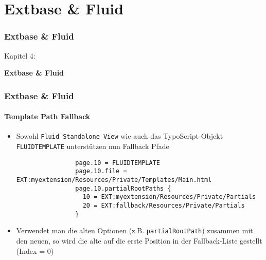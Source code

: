 %

\section{Extbase \& Fluid}
\begin{frame}[fragile]
	\frametitle{Extbase \& Fluid}

	\begin{center}\huge{Kapitel 4:}\end{center}
	\begin{center}\huge{\color{typo3darkgrey}\textbf{Extbase \& Fluid}}\end{center}

\end{frame}


\begin{frame}[fragile]
	\frametitle{Extbase \& Fluid}
	\framesubtitle{Template Path Fallback}

	\lstset{
		basicstyle=\tiny\ttfamily
	}

	\begin{itemize}

		\item Sowohl \texttt{Fluid Standalone View} wie auch das TypoScript-Objekt
			\texttt{FLUIDTEMPLATE} unterstützen nun Fallback Pfade

			\begin{lstlisting}
				page.10 = FLUIDTEMPLATE
				page.10.file = EXT:myextension/Resources/Private/Templates/Main.html
				page.10.partialRootPaths {
				  10 = EXT:myextension/Resources/Private/Partials
				  20 = EXT:fallback/Resources/Private/Partials
				}
			\end{lstlisting}

		\item Verwendet man die alten Optionen (z.B. \texttt{partialRootPath})
			zusammen mit den neuen, so wird die alte auf die erste Position in der
			Fallback-Liste gestellt (Index = 0)

	\end{itemize}

\end{frame}

